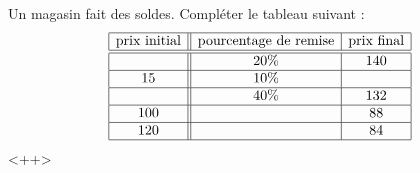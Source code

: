 
\begin{exercice}\label{exosmath-0033}

    Un magasin fait des soldes. Compléter le tableau suivant :
    \begin{equation*}
        \begin{array}[]{|c||c|c|}
            \hline
            \text{prix initial}&\text{pourcentage de remise}&\text{prix final}\\
            \hline\hline
            &20\%&140\\
            \hline
            15&10\%&\\
            \hline
            &40\%&132\\
            \hline
            100&&88\\
            \hline
            120&&84\\
            \hline
        \end{array}
    \end{equation*}
    <++>

\end{exercice}
